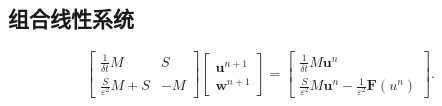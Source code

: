 \documentclass[12pt,a4paper]{article}
\begin{document}
\subsection{组合线性系统}

\[
\begin{bmatrix}
	\frac{1}{\delta t} M & S \\
	\frac{S}{\varepsilon^2} M + S & -M
\end{bmatrix}
\begin{bmatrix}
	\mathbf{u}^{n+1} \\
	\mathbf{w}^{n+1}
\end{bmatrix}
=
\begin{bmatrix}
	\frac{1}{\delta t} M \mathbf{u}^n \\
	\frac{S}{\varepsilon^2} M \mathbf{u}^n - \frac{1}{\varepsilon^2} \mathbf{F}(u^n)
\end{bmatrix}.
\]

%


	
\end{document}
